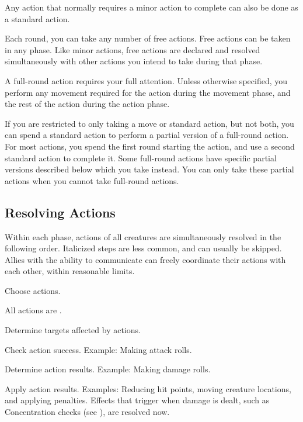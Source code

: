          Any action that normally requires a minor action to complete can also be done as a standard action.

        \label{Free Actions} Each round, you can take any number of free actions.
        Free actions can be taken in any phase.
        Like minor actions, free actions are declared and resolved simultaneously with other actions you intend to take during that phase.

         A full-round action requires your full attention.
        Unless otherwise specified, you perform any movement required for the action during the movement phase, and the rest of the action during the action phase.

         If you are restricted to only taking a move or standard action, but not both, you can spend a standard action to perform a partial version of a full-round action. For most actions, you spend the first round starting the action, and use a second standard action to complete it. Some full-round actions have specific partial versions described below which you take instead. You can only take these partial actions when you cannot take full-round actions.

    \subsection{Resolving Actions}\label{Resolving Actions}

        Within each phase, actions of all creatures are simultaneously resolved in the following order.
        Italicized steps are less common, and can usually be skipped.
        Allies with the ability to communicate can freely coordinate their actions with each other, within reasonable limits.

        \begin{enumerate*}
            \item Choose actions.
            \item All actions are .
            \item Determine targets affected by actions.
            \item Check action success.
                Example: Making attack rolls.
            \item Determine action results.
                Example: Making damage rolls.
            \item Apply action results.
                Examples: Reducing hit points, moving creature locations, and applying penalties.
                Effects that trigger when damage is dealt, such as Concentration checks (see ), are resolved now.
        \end{enumerate*}

